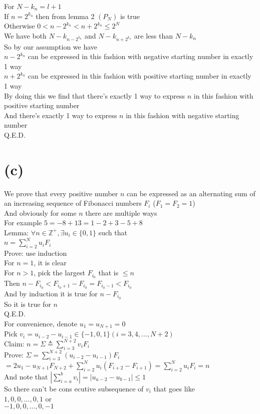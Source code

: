 \documentclass{article}
\begin{document}
For $N-k_n=l+1$\\
If $n=2^{k_n}$ then from lemma 2 $(P_N)$ is true\\
Otherwise $0<n-2^{k_n}<n+2^{k_n}\le 2^N$\\
We have both $N-k_{n-2^{k_n}}$ and $N-k_{n+2^{k_n}}$ are less than $N-k_n$\\
So by our assumption we have\\
$n-2^{k_n}$ can be expressed in this fashion with negative starting number in exactly 1 way\\
$n+2^{k_n}$ can be expressed in this fashion with positive starting number in exactly 1 way\\
By doing this we find that there's exactly 1 way to express $n$ in this fashion with positive starting number\\
And there's exactly 1 way to express $n$ in this fashion with negative starting number\\
Q.E.D.
\section{(c)}
We prove that every positive number $n$ can be expressed as an alternating sum of an increasing sequence of Fibonacci numbers $F_i$ ($F_1=F_2=1$)\\
And obviously for some $n$ there are multiple ways\\
For example $5=-8+13=1-2+3-5+8$\\[22pt]
Lemma: $\forall n\in \mathbb{Z}^+,\exists u_i\in \{0,1\}$ such that\\
$n=\sum\limits_{i=2}^N u_i F_i$\\
Prove: use induction\\
For $n=1$, it is clear\\
For $n>1$, pick the largest $F_{i_0}$ that is $\le n$\\
Then $n-F_{i_0}<F_{i_0+1}-F_{i_0}=F_{i_0-1}<F_{i_0}$\\
And by induction it is true for $n-F_{i_0}$\\
So it is true for $n$\\
Q.E.D.\\
For convenience, denote $u_1=u_{N+1}=0$\\
Pick $v_i=u_{i-2}-u_{i-1}\in \{-1,0,1\}(i=3,4,...,N+2)$\\
Claim: $n=\Sigma\triangleq\sum\limits_{i=3}^{N+2} v_i F_i$\\
Prove: $\Sigma=\sum\limits_{i=3}^{N+2}(u_{i-2}-u_{i-1})F_i$\\
$=2u_1-u_{N+1}F_{N+2}+\sum\limits_{i=2}^N u_i(F_{i+2}-F_{i+1})=\sum\limits_{i=2}^N u_i F_i=n$\\
And note that $|\sum\limits_{i=a}^b v_i|=|u_{a-2}-u_{b-1}|\le 1$\\
So there can't be cons ecutive subsequence of $v_i$ that goes like\\
$1,0,0,...,0,1$ or\\
$-1,0,0,...,0,-1$
\end{document}
